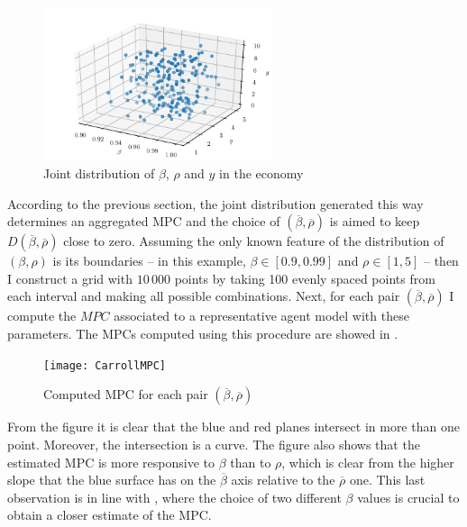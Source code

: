 \documentclass[english, a4paper, 12pt]{article}
\begin{document}
	\begin{figure}[H]
		\caption{Joint distribution of $\beta$, $\rho$ and $y$ in the economy}
		\label{fig:JointDistrib}
		\includegraphics[width=0.6\textwidth]{CarrollDistrib3d}
	\end{figure}
\vfill
According to the previous section, the joint distribution generated this way determines an aggregated MPC and the choice of $(\overline{\beta}, \overline{\rho})$ is aimed to keep $D(\overline{\beta}, \overline{\rho})$ close to zero. Assuming the only known feature of the distribution of $(\beta, \rho)$ is its boundaries -- in this example, $\beta \in [0.9, 0.99]$ and $\rho \in [1,5]$ -- then I construct a grid with $10\,000$ points by taking 100 evenly spaced points from each interval and making all possible combinations. Next, for each pair $(\overline{\beta}, \overline{\rho})$ I compute the $MPC$ associated to a representative agent model with these parameters. The MPCs computed using this procedure are showed in .
\vfill
	\begin{figure}[H]
		\caption{Computed MPC for each pair $(\overline{\beta}, \overline{\rho})$}
		\label{fig:MPCPlane}
		\texttt{[image: CarrollMPC]}
	\end{figure}
\vfill
\newpage
From the figure it is clear that the blue and red planes intersect in more than one point. Moreover, the intersection is a curve. The figure also shows that the estimated MPC is more responsive to $\beta$ than to $\rho$, which is clear from the higher slope that the blue surface has on the $\overline{\beta}$ axis relative to the $\overline{\rho}$ one. This last observation is in line with \cite{CarrollRequiem}, where the choice of two different $\beta$ values is crucial to obtain a closer estimate of the MPC. 
\end{document}
